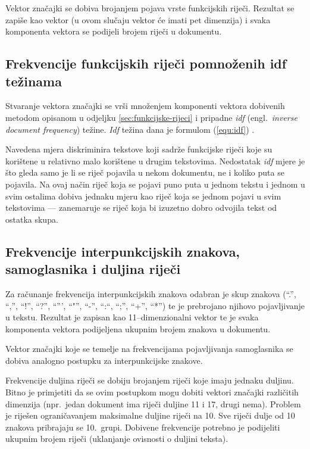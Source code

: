 \documentclass[11pt,english]{article}
\newcommand{\engl}[1]{(engl.~\emph{#1})}
\begin{document}
\begin{multicols}{2}
Vektor značajki se dobiva brojanjem pojava vrste funkcijskih riječi. Rezultat
se zapiše kao vektor (u ovom slučaju vektor će imati pet dimenzija) i svaka
komponenta vektora se podijeli brojem riječi u dokumentu.

\subsection{Frekvencije funkcijskih riječi pomnoženih idf težinama}
\label{sec:funkcijske-rijeci-idf}
Stvaranje vektora značajki se vrši množenjem komponenti vektora dobivenih metodom
opisanom u odjeljku \ref{sec:funkcijske-rijeci} i pripadne \emph{idf} \engl{inverse
document frequency} težine. \emph{Idf} težina dana je formulom (\ref{equ:idf})
\citep{diederich2003authorship}.

Navedena mjera diskriminira tekstove koji sadrže funkcijske riječi koje su
korištene u relativno malo korištene u drugim tekstovima. Nedostatak \emph{idf}
mjere je što gleda samo je li se riječ pojavila u nekom dokumentu, ne i koliko
puta se pojavila. Na ovaj način riječ koja se pojavi puno puta u jednom
tekstu i jednom u svim ostalima dobiva jednaku mjeru kao riječ koja se jednom
pojavi u svim tekstovima --- zanemaruje se riječ koja bi izuzetno dobro
odvojila tekst od ostatka skupa.

\subsection{Frekvencije interpunkcijskih znakova, samoglasnika i duljina riječi}
\label{sec:znacajke-manje}
Za računanje frekvencija interpunkcijskih znakova odabran je skup znakova (``.'',
``,'', ``!'', ``?'', ``''', ``"'', ``-'', ``:``, ``;'', ``+'', ``*'') te je
prebrojano njihovo pojavljivanje u tekstu. Rezultat je zapisan kao
11--dimenzionalni vektor te je svaka komponenta vektora podijeljena ukupnim
brojem znakova u dokumentu.

Vektor značajki koje se temelje na frekvencijama pojavljivanja samoglasnika se
dobiva analogno postupku za interpunkcijske znakove.

Frekvencije duljina riječi se dobiju brojanjem riječi koje imaju jednaku duljinu.
Bitno je primjetiti da se ovim postupkom mogu dobiti vektori značajki različitih
dimenzija (npr.~jedan dokument ima riječi duljine 11 i 17, drugi nema). Problem
je riješen ograničavanjem maksimalne duljine riječi na 10. Sve riječi dulje od 10
znakova pribrajaju se 10.~grupi. Dobivene frekvencije potrebno je podijeliti
ukupnim brojem riječi (uklanjanje ovisnosti o duljini teksta).


\end{multicols}
\end{document}

